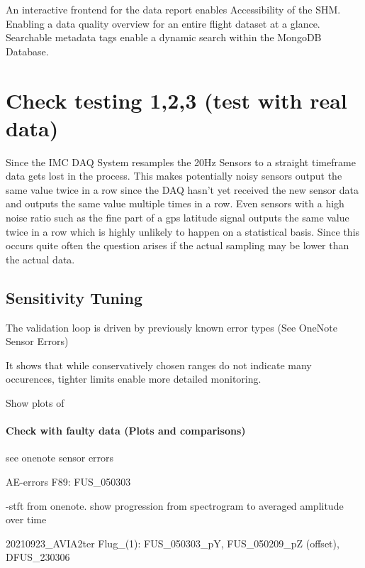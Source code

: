 An interactive frontend for the data report enables Accessibility of the SHM. Enabling a data quality overview for an entire flight dataset at a glance. Searchable metadata tags enable a dynamic search within the MongoDB Database.



\section{Check testing 1,2,3 (test with real data)}




Since the IMC DAQ System resamples the 20Hz Sensors to a straight timeframe data gets lost in the process. This makes potentially noisy sensors output the same value twice in a row since the DAQ hasn't yet received the new sensor data and outputs the same value multiple times in a row. Even sensors with a high noise ratio such as the fine part of a gps latitude signal outputs the same value twice in a row which is highly unlikely to happen on a statistical basis. Since this occurs quite often the question arises if the actual sampling may be lower than the actual data.


\subsection{Sensitivity Tuning}
The validation loop is driven by previously known error types (See OneNote Sensor Errors)

It shows that while conservatively chosen ranges do not indicate many occurences, tighter limits enable more detailed monitoring.




Show plots of
\paragraph{Check with faulty data (Plots and comparisons)}
see onenote sensor errors

AE-errors
F89: FUS_050303

-stft from onenote. show progression from spectrogram to averaged amplitude over time


20210923_AVIA2ter Flug_(1): FUS_050303_pY, FUS_050209_pZ (offset), DFUS_230306


